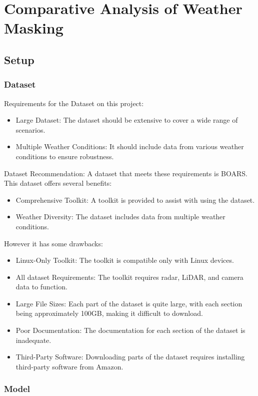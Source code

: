 \chapter{Comparative Analysis of Weather Masking}
\section{Setup}
\subsection{Dataset}
Requirements for the Dataset on this project:
\begin{itemize}
    \item Large Dataset: The dataset should be extensive to cover a wide range of scenarios.
    \item Multiple Weather Conditions: It should include data from various weather conditions to ensure robustness.
\end{itemize}
Dataset Recommendation: A dataset that meets these requirements is BOARS.\\
This dataset offers several benefits:
\begin{itemize}
    \item Comprehensive Toolkit: A toolkit is provided to assist with using the dataset.
    \item Weather Diversity: The dataset includes data from multiple weather conditions.
\end{itemize}
However it has some drawbacks:
\begin{itemize}
    \item Linux-Only Toolkit: The toolkit is compatible only with Linux devices.
    \item All dataset Requirements: The toolkit requires radar, LiDAR, and camera data to function.
    \item Large File Sizes: Each part of the dataset is quite large, with each section being approximately 100GB, making it difficult to download.
    \item Poor Documentation: The documentation for each section of the dataset is inadequate.
    \item Third-Party Software: Downloading parts of the dataset requires installing third-party software from Amazon.
\end{itemize}

\subsection{Model}

